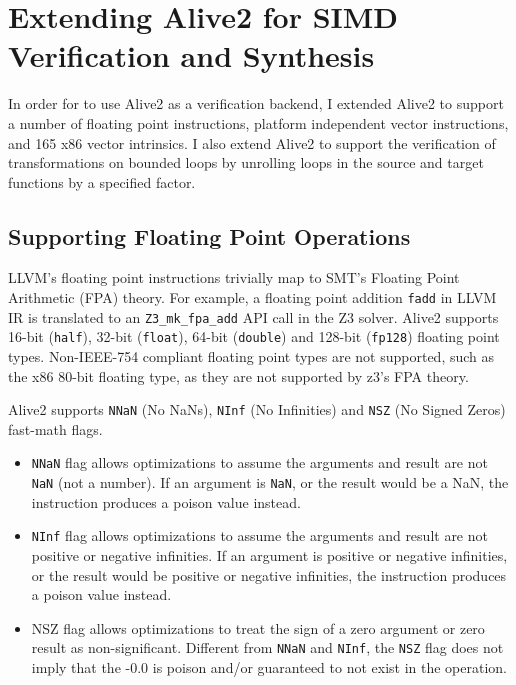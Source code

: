 \chapter{Extending Alive2 for SIMD Verification and Synthesis}
\label{chap:extending-alive2}

In order for \minotaur{} to use Alive2 as a verification backend, I extended
Alive2 to support a number of floating point instructions,
platform independent vector instructions, and 165 x86 vector intrinsics.
%
I also extend Alive2 to support the verification of transformations on
bounded loops by unrolling loops in the source and target functions by
a specified factor.

\section{Supporting Floating Point Operations}

LLVM's floating point instructions trivially map to SMT's Floating
Point Arithmetic (FPA) theory.
%
For example, a floating point addition \texttt{fadd} in LLVM IR is
translated to an \texttt{Z3\_mk\_fpa\_add} API call in the Z3 solver.
%
Alive2 supports 16-bit (\texttt{half}), 32-bit (\texttt{float}), 64-bit
(\texttt{double}) and 128-bit (\texttt{fp128}) floating point types.
%
Non-IEEE-754 compliant floating point types are not supported, such as
the x86 80-bit floating type, as they are not supported by z3's FPA
theory.

Alive2 supports \texttt{NNaN} (No NaNs), \texttt{NInf} (No Infinities) and
\texttt{NSZ} (No Signed Zeros) fast-math flags.

\begin{itemize}

\item \texttt{NNaN} flag allows optimizations to assume the arguments
and result are not \texttt{NaN} (not a number). If an argument is
\texttt{NaN}, or the result would be a NaN, the instruction produces a
poison value instead.

\item \texttt{NInf} flag allows optimizations to assume the arguments
and result are not positive or negative infinities. If an argument is
positive or negative infinities, or the result would be positive or
negative infinities, the instruction produces a poison value instead.

\item NSZ flag allows optimizations to treat the sign of a zero
argument or zero result as non-significant. Different from
\texttt{NNaN} and \texttt{NInf}, the \texttt{NSZ} flag does not imply
that the -0.0 is poison and/or guaranteed to not exist in the
operation.

\end{itemize}

